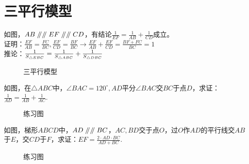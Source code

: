 \section{三平行模型}
\begin{definition}
    如图，$AB\mathrel{/\mkern-5mu/} \mathrel{/\mkern-5mu/} EF\mathrel{/\mkern-5mu/} \mathrel{/\mkern-5mu/} CD$，有结论$\frac{1}{EF}=\frac{1}{AB}+\frac{1}{CD}$成立。\\
    证明：$\frac{EF}{AB}=\frac{FC}{BC},\frac{EF}{CD}=\frac{BF}{BC}\rightarrow \frac{EF}{AB}+\frac{EF}{CD}=\frac{BF+FC}{BC}=1$ \\
    推论：$\frac{1}{S_{\triangle EBC}}=\frac{1}{S_{\triangle ABC}}+\frac{1}{S_{\triangle DBC}} \\$
\end{definition}
\begin{figure}[H]
    \centering
    \resizebox{4cm}{!}{}
    \caption{三平行模型}
\end{figure}
\begin{problem}
如图，在$\triangle ABC$中，$\angle BAC=120^\circ,AD$平分$\angle BAC$交$BC$于点$D$，求证：$\frac{1}{AD}=\frac{1}{AB}+\frac{1}{AC}.$ \\
\end{problem}
\begin{figure}[H]
    \centering
    \resizebox{4cm}{!}{}
    \caption{练习图}
\end{figure}
\begin{problem}
如图，梯形$ABCD$中，$AD\mathrel{/\mkern-5mu/} \mathrel{/\mkern-5mu/} BC$，$AC,BD$交于点$O$，过$O$作$AD$的平行线交$AB$于$E$，交$CD$于$F$，求证：$EF=\frac{2·AD·BC}{AD+BC}.$\\
\end{problem}
\begin{figure}[H]
    \centering
    \resizebox{4cm}{!}{}
    \caption{练习图}
\end{figure}
\clearpage
